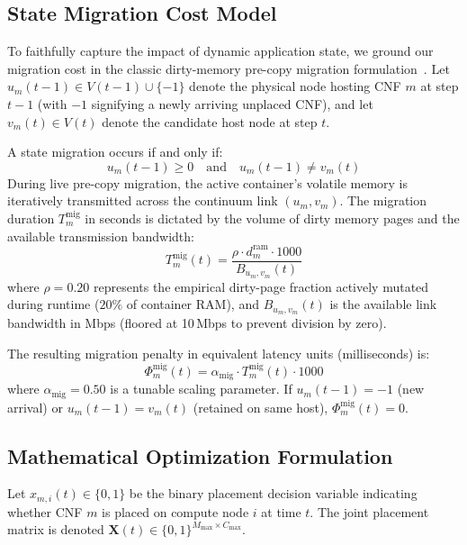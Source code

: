\documentclass[conference]{IEEEtran}
\begin{document}
\subsection{State Migration Cost Model}
To faithfully capture the impact of dynamic application state, we ground our migration cost in the classic dirty-memory pre-copy migration formulation~\cite{clark2005live}. Let $u_m(t-1) \in V(t-1) \cup \{-1\}$ denote the physical node hosting CNF $m$ at step $t-1$ (with $-1$ signifying a newly arriving unplaced CNF), and let $v_m(t) \in V(t)$ denote the candidate host node at step $t$.

A state migration occurs if and only if:
\begin{equation}
u_m(t-1) \ge 0 \quad \text{and} \quad u_m(t-1) \ne v_m(t)
\end{equation}
During live pre-copy migration, the active container's volatile memory is iteratively transmitted across the continuum link $(u_m, v_m)$. The migration duration $T_{m}^{\text{mig}}$ in seconds is dictated by the volume of dirty memory pages and the available transmission bandwidth:
\begin{equation}
T_{m}^{\text{mig}}(t) = \frac{\rho \cdot d_m^{\text{ram}} \cdot 1000}{B_{u_m, v_m}(t)}
\end{equation}
where $\rho = 0.20$ represents the empirical dirty-page fraction actively mutated during runtime ($20\%$ of container RAM), and $B_{u_m, v_m}(t)$ is the available link bandwidth in Mbps (floored at 10\,Mbps to prevent division by zero).

The resulting migration penalty in equivalent latency units (milliseconds) is:
\begin{equation}
\Phi_{m}^{\text{mig}}(t) = \alpha_{\text{mig}} \cdot T_{m}^{\text{mig}}(t) \cdot 1000
\end{equation}
where $\alpha_{\text{mig}} = 0.50$ is a tunable scaling parameter. If $u_m(t-1) = -1$ (new arrival) or $u_m(t-1) = v_m(t)$ (retained on same host), $\Phi_{m}^{\text{mig}}(t) = 0$.

\subsection{Mathematical Optimization Formulation}
Let $x_{m, i}(t) \in \{0, 1\}$ be the binary placement decision variable indicating whether CNF $m$ is placed on compute node $i$ at time $t$. The joint placement matrix is denoted $\mathbf{X}(t) \in \{0, 1\}^{M_{\max} \times C_{\max}}$.
\end{document}
